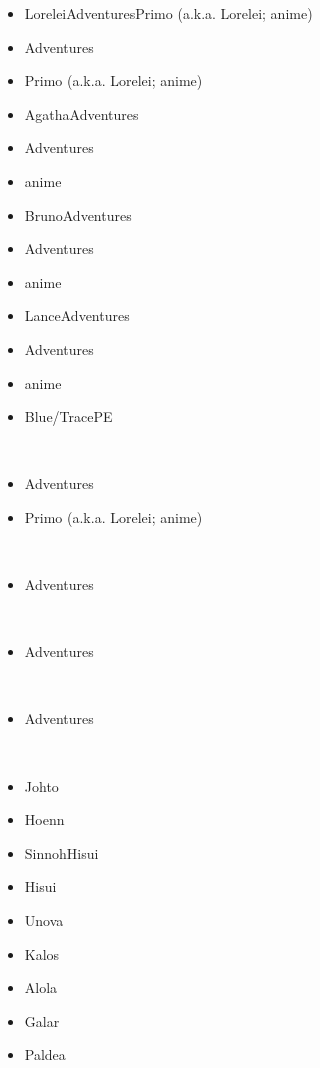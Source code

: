 \documentclass[a4paper,12pt]{article}
\begin{document}
\begin{itemize}
\item LoreleiAdventuresPrimo (a.k.a. Lorelei; anime)
\item Adventures
\item Primo (a.k.a. Lorelei; anime)
\item AgathaAdventures
\item Adventures
\item anime
\item BrunoAdventures
\item Adventures
\item anime
\item LanceAdventures
\item Adventures
\item anime
\item Blue/TracePE
\end{itemize}\\ \par \vspace{0.5cm}

\begin{itemize}
\item Adventures
\item Primo (a.k.a. Lorelei; anime)
\end{itemize}\\ \par \vspace{0.5cm}

\begin{itemize}
\item Adventures
\end{itemize}\\ \par \vspace{0.5cm}

\begin{itemize}
\item Adventures
\end{itemize}\\ \par \vspace{0.5cm}

\begin{itemize}
\item Adventures
\end{itemize}\\ \par \vspace{0.5cm}

\begin{itemize}
\item Johto
\item Hoenn
\item SinnohHisui
\item Hisui
\item Unova
\item Kalos
\item Alola
\item Galar
\item Paldea
\end{itemize}\\ \par \vspace{0.5cm}
\end{document}
